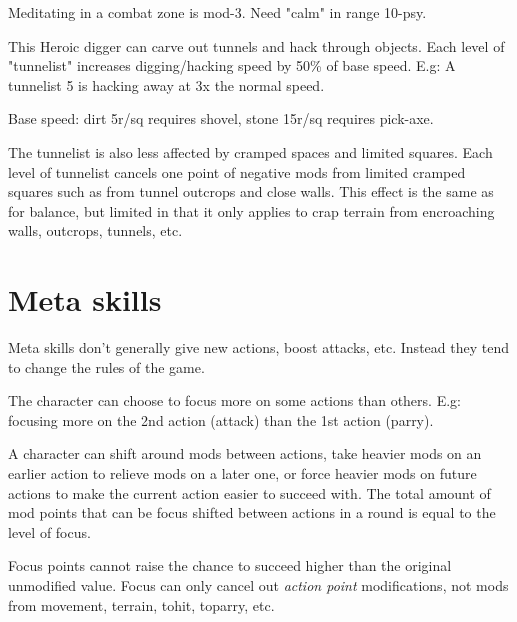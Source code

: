 Meditating in a combat zone is mod-3. Need "calm" in range 10-psy.


 This Heroic digger can carve out tunnels and hack through objects. Each level of "tunnelist" increases digging/hacking speed by 50\% of base speed. E.g: A tunnelist 5 is hacking away at 3x the normal speed.

Base speed: dirt 5r/sq requires shovel, stone 15r/sq requires pick-axe.

The tunnelist is also less affected by cramped spaces and limited squares. Each level of tunnelist cancels one point of negative mods from limited cramped squares such as from tunnel outcrops and close walls. This effect is the same as for balance, but limited in that it only applies to crap terrain from encroaching walls, outcrops, tunnels, etc.


\closeskillslist


















\section*{Meta skills}

Meta skills don't generally give new actions, boost attacks, etc. Instead they tend to change the rules of the game.



\openskillslist


 The character can choose to focus more on some actions than others. E.g: focusing more on the 2nd action (attack) than the 1st action (parry).

A character can shift around mods between actions, take heavier mods on an earlier action to relieve mods on a later one, or force heavier mods on future actions to make the current action easier to succeed with. The total amount of mod points that can be focus shifted between actions in a round is equal to the level of focus.

Focus points cannot raise the chance to succeed higher than the original unmodified value. Focus can only cancel out \emph{action point} modifications, not mods from movement, terrain, tohit, toparry, etc.

